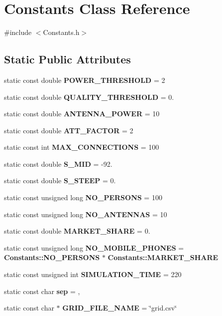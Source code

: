 \section{Constants Class Reference}
\label{class_constants}


{\ttfamily \#include $<$Constants.\+h$>$}

\subsection*{Static Public Attributes}
\begin{DoxyCompactItemize}
\item 
static const double \textbf{ P\+O\+W\+E\+R\+\_\+\+T\+H\+R\+E\+S\+H\+O\+LD} = 2
\item 
static const double \textbf{ Q\+U\+A\+L\+I\+T\+Y\+\_\+\+T\+H\+R\+E\+S\+H\+O\+LD} = 0.
\item 
static const double \textbf{ A\+N\+T\+E\+N\+N\+A\+\_\+\+P\+O\+W\+ER} = 10
\item 
static const double \textbf{ A\+T\+T\+\_\+\+F\+A\+C\+T\+OR} = 2
\item 
static const int \textbf{ M\+A\+X\+\_\+\+C\+O\+N\+N\+E\+C\+T\+I\+O\+NS} = 100
\item 
static const double \textbf{ S\+\_\+\+M\+ID} = -\/92.
\item 
static const double \textbf{ S\+\_\+\+S\+T\+E\+EP} = 0.
\item 
static const unsigned long \textbf{ N\+O\+\_\+\+P\+E\+R\+S\+O\+NS} = 100
\item 
static const unsigned long \textbf{ N\+O\+\_\+\+A\+N\+T\+E\+N\+N\+AS} = 10
\item 
static const double \textbf{ M\+A\+R\+K\+E\+T\+\_\+\+S\+H\+A\+RE} = 0.
\item 
static const unsigned long \textbf{ N\+O\+\_\+\+M\+O\+B\+I\+L\+E\+\_\+\+P\+H\+O\+N\+ES} = \textbf{ Constants\+::\+N\+O\+\_\+\+P\+E\+R\+S\+O\+NS} $\ast$ \textbf{ Constants\+::\+M\+A\+R\+K\+E\+T\+\_\+\+S\+H\+A\+RE}
\item 
static const unsigned int \textbf{ S\+I\+M\+U\+L\+A\+T\+I\+O\+N\+\_\+\+T\+I\+ME} = 220
\item 
static const char \textbf{ sep} = \textquotesingle{},\textquotesingle{}
\item 
static const char $\ast$ \textbf{ G\+R\+I\+D\+\_\+\+F\+I\+L\+E\+\_\+\+N\+A\+ME} = \char`\"{}grid.\+csv\char`\"{}
\end{DoxyCompactItemize}


